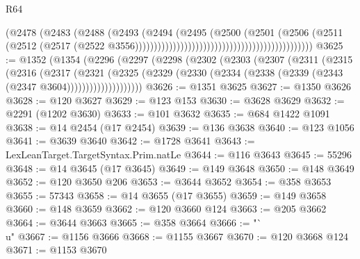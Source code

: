 \begin{lexlean}{R64}
\begin{coremodule}
                                                                        (@2478
                                                                          (@2483
                                                                            (@2488
                                                                              (@2493
                                                                                (@2494
                                                                                  (@2495
                                                                                    (@2500
                                                                                      (@2501
                                                                                        (@2506
                                                                                          (@2511
                                                                                            (@2512
                                                                                              (@2517
                                                                                                (@2522
                                                                                                  @3556)))))))))))))))))))))))))))))))))))))))))))))))
@3625 := @1352
    (@1354
      (@2296
        (@2297
          (@2298
            (@2302
              (@2303
                (@2307
                  (@2311
                    (@2315
                      (@2316
                        (@2317
                          (@2321
                            (@2325
                              (@2329
                                (@2330 (@2334 (@2338 (@2339 (@2343 (@2347 @3604))))))))))))))))))))
@3626 := @1351 @3625
@3627 := @1350 @3626
@3628 := @120 @3627
@3629 := @123 @153
@3630 := @3628 @3629
@3632 := @2291 (@1202 @3630)
@3633 := @101 @3632
@3635 := @684 @1422 @1091
@3638 := @14 @2454 (@17 @2454)
@3639 := @136 @3638
@3640 := @123 @1056
@3641 := @3639 @3640
@3642 := @1728 @3641
@3643 := LexLeanTarget.TargetSyntax.Prim.natLe
@3644 := @116 @3643
@3645 := 55296
@3648 := @14 @3645 (@17 @3645)
@3649 := @149 @3648
@3650 := @148 @3649
@3652 := @120 @3650 @206
@3653 := @3644 @3652
@3654 := @358 @3653
@3655 := 57343
@3658 := @14 @3655 (@17 @3655)
@3659 := @149 @3658
@3660 := @148 @3659
@3662 := @120 @3660 @124
@3663 := @205 @3662
@3664 := @3644 @3663
@3665 := @358 @3664
@3666 := "`\\u"
@3667 := @1156 @3666
@3668 := @1155 @3667
@3670 := @120 @3668 @124
@3671 := @1153 @3670

\end{coremodule}
\end{lexlean}
